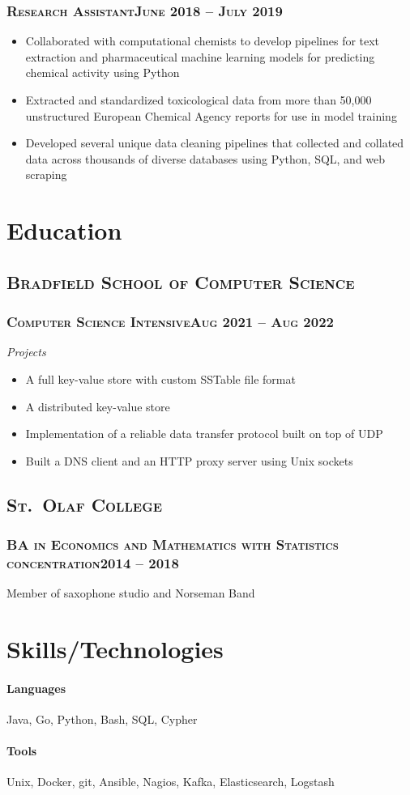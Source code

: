 \documentclass{article}
\newcommand{\resumeSection}[1]{\section*{#1}}
\newcommand{\institution}[1]{\subsection*{\scshape{#1}}}
\newcommand{\jobPosition}[3]{\subsubsection*{\scshape{#1}\hfill #2 -- #3}}
\begin{document}
    \jobPosition{Research Assistant}{June 2018}{July 2019}
    \begin{itemize}[noitemsep]
      \item
            Collaborated with computational chemists to develop
            pipelines for text extraction and pharmaceutical machine
            learning models for predicting chemical activity using Python
      \item
            Extracted and standardized toxicological data from more
            than 50,000 unstructured European Chemical Agency reports
            for use in model training
      \item
            Developed several unique data cleaning pipelines that
            collected and collated data across thousands of diverse
            databases using Python, SQL, and web scraping
    \end{itemize}

\resumeSection{Education}
  \institution{Bradfield School of Computer Science}
    \jobPosition{Computer Science Intensive}{Aug 2021}{Aug 2022}
    \emph{Projects}
    \begin{itemize}[noitemsep]
      \item A full key-value store with custom SSTable file format
      \item A distributed key-value store
      \item Implementation of a reliable data transfer protocol built on top of UDP
      \item Built a DNS client and an HTTP proxy server using Unix sockets
    \end{itemize}

  \institution{St.\ Olaf College}
    \jobPosition{BA in Economics and Mathematics with Statistics concentration}{2014}{2018}
    Member of saxophone studio and Norseman Band

\resumeSection{Skills/Technologies}
  \paragraph{Languages}
    Java,
    Go,
    Python,
    Bash,
    SQL,
    Cypher
  \paragraph{Tools}
    Unix,
    Docker,
    git,
    Ansible,
    Nagios,
    Kafka,
    Elasticsearch,
    Logstash
\end{document}
